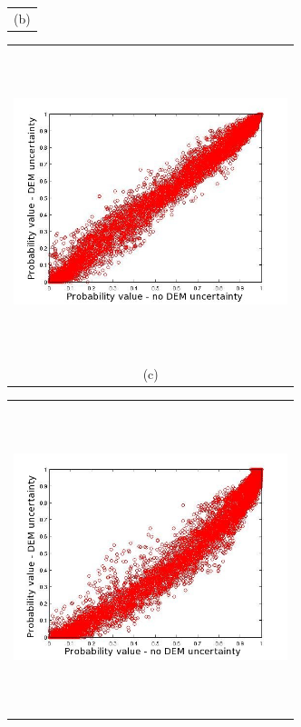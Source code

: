 \documentclass[12pt]{article}
\newcommand{\Pic}[2][0.85]{\begin{center}\texttt{[image: \#2]}
 \end{center} }
\begin{document}
\begin{figure}[H]
\begin{minipage}{0.6\textwidth}
\begin{tabular}{c}
        (b)
        \end{tabular}
    \end{minipage} 
    \begin{minipage}[b]{0.6\textwidth}
        \begin{tabular}{c}
       \includegraphics[width=8cm,height=9cm,keepaspectratio]{figs/Mammoth_Topsar_vs_meth0.jpg}\\
        (c)
        \end{tabular}
    \end{minipage}
    \begin{minipage}{0.6\textwidth}
        \begin{tabular}{c}
	\includegraphics[width=8cm,height=9cm,keepaspectratio]{figs/Mammoth_Topsar_vs_meth3.jpg}\\

\end{tabular}
\end{minipage}
\end{figure}
\end{document}
